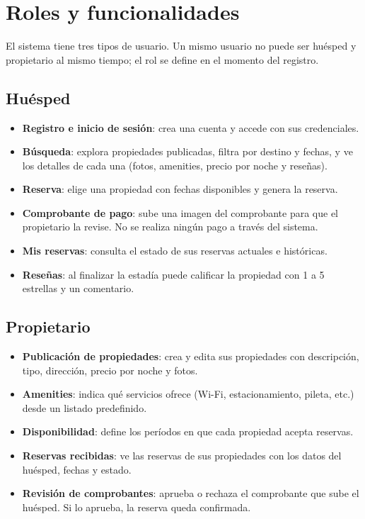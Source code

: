 \documentclass[12pt,a4paper]{article}
\begin{document}
\section{Roles y funcionalidades}

El sistema tiene tres tipos de usuario. Un mismo usuario no puede ser huésped y propietario
al mismo tiempo; el rol se define en el momento del registro.

\subsection{Huésped}

\begin{itemize}[leftmargin=1.5em]
  \item \textbf{Registro e inicio de sesión}: crea una cuenta y accede con sus credenciales.
  \item \textbf{Búsqueda}: explora propiedades publicadas, filtra por destino y fechas, y ve los detalles de cada una (fotos, amenities, precio por noche y reseñas).
  \item \textbf{Reserva}: elige una propiedad con fechas disponibles y genera la reserva.
  \item \textbf{Comprobante de pago}: sube una imagen del comprobante para que el propietario la revise. No se realiza ningún pago a través del sistema.
  \item \textbf{Mis reservas}: consulta el estado de sus reservas actuales e históricas.
  \item \textbf{Reseñas}: al finalizar la estadía puede calificar la propiedad con 1 a 5 estrellas y un comentario.
\end{itemize}

\subsection{Propietario}

\begin{itemize}[leftmargin=1.5em]
  \item \textbf{Publicación de propiedades}: crea y edita sus propiedades con descripción, tipo, dirección, precio por noche y fotos.
  \item \textbf{Amenities}: indica qué servicios ofrece (Wi-Fi, estacionamiento, pileta, etc.) desde un listado predefinido.
  \item \textbf{Disponibilidad}: define los períodos en que cada propiedad acepta reservas.
  \item \textbf{Reservas recibidas}: ve las reservas de sus propiedades con los datos del huésped, fechas y estado.
  \item \textbf{Revisión de comprobantes}: aprueba o rechaza el comprobante que sube el huésped. Si lo aprueba, la reserva queda confirmada.
\end{itemize}
\end{document}
